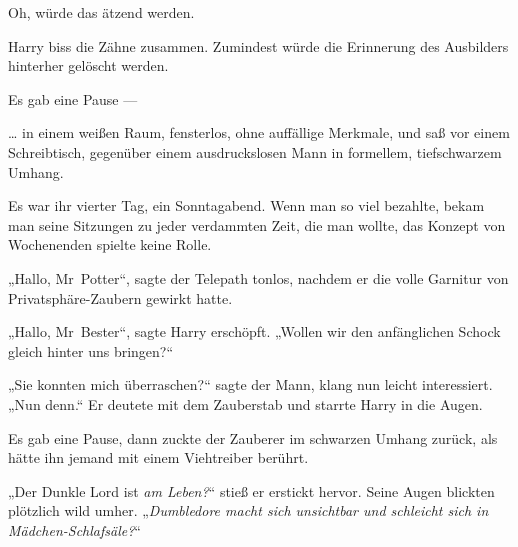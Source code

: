 Oh, würde das ätzend werden.

Harry biss die Zähne zusammen. Zumindest würde die Erinnerung des Ausbilders hinterher gelöscht werden.


Es gab eine Pause —

\later

… in einem weißen Raum, fensterlos, ohne auffällige Merkmale, und saß vor einem Schreibtisch, gegenüber einem ausdruckslosen Mann in formellem, tiefschwarzem Umhang.

Es war ihr vierter Tag, ein Sonntagabend. Wenn man so viel bezahlte, bekam man seine Sitzungen zu jeder verdammten Zeit, die man wollte, das Konzept von Wochenenden spielte keine Rolle.

„Hallo, Mr~Potter“, sagte der Telepath tonlos, nachdem er die volle Garnitur von Privatsphäre-Zaubern gewirkt hatte.

„Hallo, Mr~Bester“, sagte Harry erschöpft.
„Wollen wir den anfänglichen Schock gleich hinter uns bringen?“

„Sie konnten mich überraschen?“ sagte der Mann, klang nun leicht interessiert.
„Nun denn.“ Er deutete mit dem Zauberstab und starrte Harry in die Augen. 

Es gab eine Pause, dann zuckte der Zauberer im schwarzen Umhang zurück, als hätte ihn jemand mit einem Viehtreiber berührt.

„Der Dunkle Lord ist \emph{am Leben?}“ stieß er erstickt hervor. Seine Augen blickten plötzlich wild umher.
„\emph{Dumbledore macht sich unsichtbar und schleicht sich in Mädchen-Schlafsäle?}“

